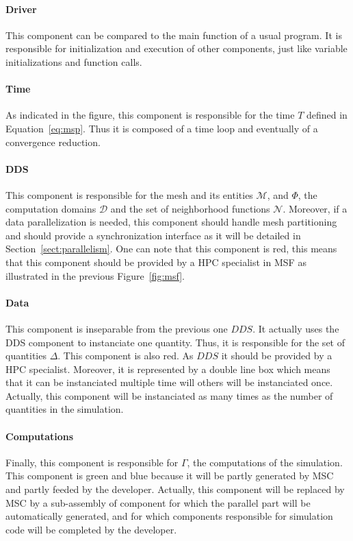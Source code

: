 \paragraph{\textbf{Driver}}
This component can be compared to the main function of a usual program. It is responsible for initialization and execution of other components, just like variable initializations and function calls.

\paragraph{\textbf{Time}}
As indicated in the figure, this component is responsible for the time $T$ defined in Equation~\ref{eq:msp}. Thus it is composed of a time loop and eventually of a convergence reduction.

\paragraph{\textbf{DDS}}
This component is responsible for the mesh and its entities $\mathcal{M}$, and $\Phi$, the computation domains $\mathcal{D}$ and the set of neighborhood functions $\mathcal{N}$. Moreover, if a data parallelization is needed, this component should handle mesh partitioning and should provide a synchronization interface as it will be detailed in Section~\ref{sect:parallelism}. One can note that this component is red, this means that this component should be provided by a HPC specialist in MSF as illustrated in the previous Figure~\ref{fig:msf}.

\paragraph{\textbf{Data}}
This component is inseparable from the previous one $DDS$. It actually uses the DDS component to instanciate one quantity. Thus, it is responsible for the set of quantities $\Delta$. This component is also red. As $DDS$ it should be provided by a HPC specialist. Moreover, it is represented by a double line box which means that it can be instanciated multiple time will others will be instanciated once. Actually, this component will be instanciated as many times as the number of quantities in the simulation.

\paragraph{\textbf{Computations}}
Finally, this component is responsible for $\Gamma$, \ie the computations of the simulation. This component is green and blue because it will be partly generated by MSC and partly feeded by the developer. Actually, this component will be replaced by MSC by a sub-assembly of component for which the parallel part will be automatically generated, and for which components responsible for simulation code will be completed by the developer.

